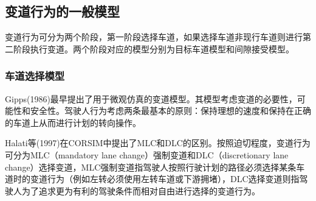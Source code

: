 %

\subsection{变道行为的一般模型}
变道行为可分为两个阶段，第一阶段选择车道，如果选择车道非现行车道则进行第二阶段执行变道。两个阶段对应的模型分别为目标车道模型和间隙接受模型。
\subsubsection{车道选择模型}

Gipps(1986)最早提出了用于微观仿真的变道模型\cite{Gipps1986}。其模型考虑变道的必要性，可能性和安全性。驾驶人行为考虑两条最基本的原则：保持理想的速度和保持在正确的车道上从而进行计划的转向操作。

Halati等(1997)在CORSIM中提出了MLC和DLC的区别\cite{Halati1997}。按照迫切程度，变道行为可分为MLC（mandatory lane change）强制变道和DLC（discretionary lane change）选择变道，MLC强制变道指驾驶人按照行驶计划的路径必须选择某条车道时的变道行为（例如左转必须使用左转车道或下游拥堵），DLC选择变道则指驾驶人为了追求更为有利的驾驶条件而相对自由进行选择的变道行为。




 


